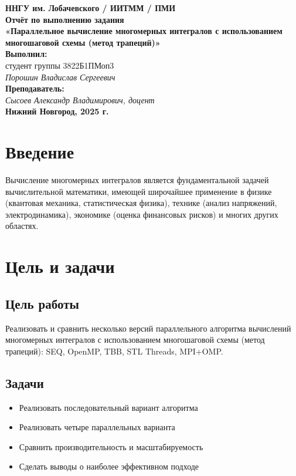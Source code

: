 \documentclass[12pt]{article}
\begin{document}
\begin{titlepage}
    \begin{center}
        \large 
        \textbf{ННГУ им. Лобачевского / ИИТММ / ПМИ}\\[0.5cm]

        \vspace{4cm}
        \textbf{\Large Отчёт по выполнению задания}\\
        \textbf{\large «Параллельное вычисление многомерных интегралов с использованием многошаговой схемы (метод трапеций)»}\\[3cm]

        \vspace{3cm}
        \textbf{Выполнил:}\\
        студент группы 3822Б1ПМоп3 \\
        \textit{Порошин Владислав Сергеевич}\\[1cm]

        \textbf{Преподаватель:}\\
        \textit{Сысоев Александр Владимирович, доцент}\\[2cm]

        \vfill
        \textbf{Нижний Новгород, 2025 г.}
    \end{center}
\end{titlepage}

\tableofcontents
\newpage

\section{Введение}
Вычисление многомерных интегралов является фундаментальной задачей вычислительной математики, имеющей широчайшее применение в физике (квантовая механика, статистическая физика), технике (анализ напряжений, электродинамика), экономике (оценка финансовых рисков) и многих других областях.

\section{Цель и задачи}
\subsection*{Цель работы}
Реализовать и сравнить несколько версий параллельного алгоритма вычислений многомерных интегралов с использованием многошаговой схемы (метод трапеций): SEQ, OpenMP, TBB, STL Threads, MPI+OMP.

\subsection*{Задачи}
\begin{itemize}
  \item Реализовать последовательный вариант алгоритма
  \item Реализовать четыре параллельных варианта
  \item Сравнить производительность и масштабируемость
  \item Сделать выводы о наиболее эффективном подходе
\end{itemize}
\end{document}
